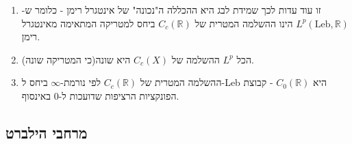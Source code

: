 \documentclass{tstextbook}
\begin{document}
\begin{remark}
  \begin{enumerate}
    \item זו עוד עדות לכך שמידת לבג היא ההכללה ה"נכונה" של אינטגרל רימן - כלומר ש-\(L^{p}\left( \text{Leb},\mathbb{R} \right)\) הינו ההשלמה המטרית של \(C_{c}\left( \mathbb{R} \right)\) ביחס למטריקה המתאימה מאינטגרל רימן. 


    \item הכל \(L^{p}\) ההשלמה של \(C_{c}(X)\) היא שונה(כי המטריקה שונה). 


    \item ההשלמה המטרית של \(C_{c}\left( \mathbb{R} \right)\) לפי נורמת-\(\infty\) ביחס ל-Leb היא \(C_{0}\left( \mathbb{R} \right)\) - קבוצת הפונקציות הרציפות שדועכות ל-0 באינסוף. 


  \end{enumerate}
\end{remark}
\subsection{מרחבי הילברט}
\end{document}
